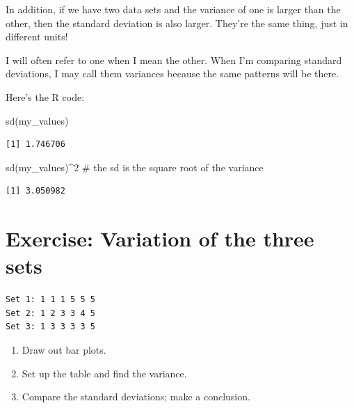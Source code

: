 \documentclass[
  letterpaper,
  DIV=11,
  numbers=noendperiod]{scrreprt}
\newenvironment{Shaded}{\begin{snugshade}}{\end{snugshade}}
\newcommand{\CommentTok}[1]{\textcolor[rgb]{0.37,0.37,0.37}{#1}}
\newcommand{\DecValTok}[1]{\textcolor[rgb]{0.68,0.00,0.00}{#1}}
\newcommand{\FunctionTok}[1]{\textcolor[rgb]{0.28,0.35,0.67}{#1}}
\newcommand{\NormalTok}[1]{\textcolor[rgb]{0.00,0.23,0.31}{#1}}
\newcommand{\SpecialCharTok}[1]{\textcolor[rgb]{0.37,0.37,0.37}{#1}}
\providecommand{\tightlist}{%
  \setlength{\itemsep}{0pt}\setlength{\parskip}{0pt}}\usepackage{longtable,booktabs,array}
\begin{document}
In addition, if we have two data sets and the variance of one is larger
than the other, then the standard deviation is also larger. They're the
same thing, just in different units!

I will often refer to one when I mean the other. When I'm comparing
standard deviations, I may call them variances because the same patterns
will be there.

Here's the R code:

\begin{Shaded}
\begin{Highlighting}[]
\FunctionTok{sd}\NormalTok{(my\_values)}
\end{Highlighting}
\end{Shaded}

\begin{verbatim}
[1] 1.746706
\end{verbatim}

\begin{Shaded}
\begin{Highlighting}[]
\FunctionTok{sd}\NormalTok{(my\_values)}\SpecialCharTok{\^{}}\DecValTok{2} \CommentTok{\# the sd is the square root of the variance}
\end{Highlighting}
\end{Shaded}

\begin{verbatim}
[1] 3.050982
\end{verbatim}

\hypertarget{exercise-variation-of-the-three-sets}{%
\section{Exercise: Variation of the three
sets}\label{exercise-variation-of-the-three-sets}}

\begin{verbatim}
Set 1: 1 1 1 5 5 5
Set 2: 1 2 3 3 4 5
Set 3: 1 3 3 3 3 5
\end{verbatim}

\pspace

\begin{enumerate}
\def\labelenumi{\arabic{enumi}.}
\tightlist
\item
  Draw out bar plots.\lspace
\item
  Set up the table and find the variance.\lspace
\item
  Compare the standard deviations; make a conclusion.
\end{enumerate}
\end{document}
